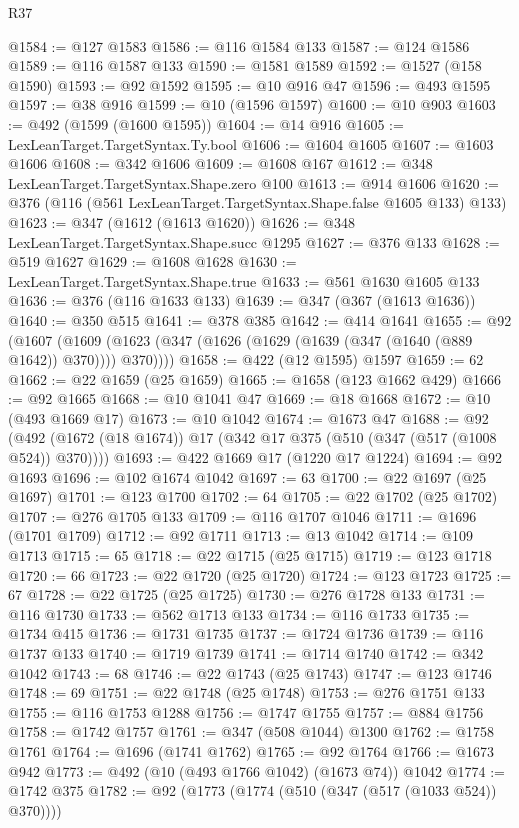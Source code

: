 \begin{lexlean}{R37}
\begin{coremodule}
@1584 := @127 @1583
@1586 := @116 @1584 @133
@1587 := @124 @1586
@1589 := @116 @1587 @133
@1590 := @1581 @1589
@1592 := @1527 (@158 @1590)
@1593 := @92 @1592
@1595 := @10 @916 @47
@1596 := @493 @1595
@1597 := @38 @916
@1599 := @10 (@1596 @1597)
@1600 := @10 @903
@1603 := @492 (@1599 (@1600 @1595))
@1604 := @14 @916
@1605 := LexLeanTarget.TargetSyntax.Ty.bool
@1606 := @1604 @1605
@1607 := @1603 @1606
@1608 := @342 @1606
@1609 := @1608 @167
@1612 := @348 LexLeanTarget.TargetSyntax.Shape.zero @100
@1613 := @914 @1606
@1620 := @376 (@116 (@561 LexLeanTarget.TargetSyntax.Shape.false @1605 @133) @133)
@1623 := @347 (@1612 (@1613 @1620))
@1626 := @348 LexLeanTarget.TargetSyntax.Shape.succ @1295
@1627 := @376 @133
@1628 := @519 @1627
@1629 := @1608 @1628
@1630 := LexLeanTarget.TargetSyntax.Shape.true
@1633 := @561 @1630 @1605 @133
@1636 := @376 (@116 @1633 @133)
@1639 := @347 (@367 (@1613 @1636))
@1640 := @350 @515
@1641 := @378 @385
@1642 := @414 @1641
@1655 := @92
    (@1607 (@1609 (@1623 (@347 (@1626 (@1629 (@1639 (@347 (@1640 (@889 @1642)) @370)))) @370))))
@1658 := @422 (@12 @1595) @1597
@1659 := 62
@1662 := @22 @1659 (@25 @1659)
@1665 := @1658 (@123 @1662 @429)
@1666 := @92 @1665
@1668 := @10 @1041 @47
@1669 := @18 @1668
@1672 := @10 (@493 @1669 @17)
@1673 := @10 @1042
@1674 := @1673 @47
@1688 := @92 (@492 (@1672 (@18 @1674)) @17 (@342 @17 @375 (@510 (@347 (@517 (@1008 @524)) @370))))
@1693 := @422 @1669 @17 (@1220 @17 @1224)
@1694 := @92 @1693
@1696 := @102 @1674 @1042
@1697 := 63
@1700 := @22 @1697 (@25 @1697)
@1701 := @123 @1700
@1702 := 64
@1705 := @22 @1702 (@25 @1702)
@1707 := @276 @1705 @133
@1709 := @116 @1707 @1046
@1711 := @1696 (@1701 @1709)
@1712 := @92 @1711
@1713 := @13 @1042
@1714 := @109 @1713
@1715 := 65
@1718 := @22 @1715 (@25 @1715)
@1719 := @123 @1718
@1720 := 66
@1723 := @22 @1720 (@25 @1720)
@1724 := @123 @1723
@1725 := 67
@1728 := @22 @1725 (@25 @1725)
@1730 := @276 @1728 @133
@1731 := @116 @1730
@1733 := @562 @1713 @133
@1734 := @116 @1733
@1735 := @1734 @415
@1736 := @1731 @1735
@1737 := @1724 @1736
@1739 := @116 @1737 @133
@1740 := @1719 @1739
@1741 := @1714 @1740
@1742 := @342 @1042
@1743 := 68
@1746 := @22 @1743 (@25 @1743)
@1747 := @123 @1746
@1748 := 69
@1751 := @22 @1748 (@25 @1748)
@1753 := @276 @1751 @133
@1755 := @116 @1753 @1288
@1756 := @1747 @1755
@1757 := @884 @1756
@1758 := @1742 @1757
@1761 := @347 (@508 @1044) @1300
@1762 := @1758 @1761
@1764 := @1696 (@1741 @1762)
@1765 := @92 @1764
@1766 := @1673 @942
@1773 := @492 (@10 (@493 @1766 @1042) (@1673 @74)) @1042
@1774 := @1742 @375
@1782 := @92 (@1773 (@1774 (@510 (@347 (@517 (@1033 @524)) @370))))

\end{coremodule}
\end{lexlean}
